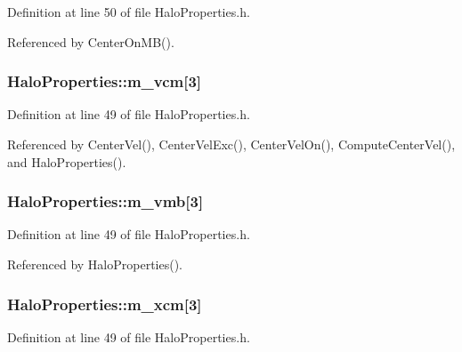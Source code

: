 Definition at line 50 of file HaloProperties.h.



Referenced by CenterOnMB().

\subsubsection[{m\_\-vcm}]{ {\bf HaloProperties::m\_\-vcm}\mbox{[}3\mbox{]}}\label{classHaloProperties_a367b37a34cf13626d6a6f008daadedf4}


Definition at line 49 of file HaloProperties.h.



Referenced by CenterVel(), CenterVelExc(), CenterVelOn(), ComputeCenterVel(), and HaloProperties().

\subsubsection[{m\_\-vmb}]{ {\bf HaloProperties::m\_\-vmb}\mbox{[}3\mbox{]}}\label{classHaloProperties_a17b99f065e4e45eda4a15d2cdf8adef4}


Definition at line 49 of file HaloProperties.h.



Referenced by HaloProperties().

\subsubsection[{m\_\-xcm}]{ {\bf HaloProperties::m\_\-xcm}\mbox{[}3\mbox{]}}\label{classHaloProperties_ad839c03623bf7980cc14a7fa5ea2fdc2}


Definition at line 49 of file HaloProperties.h.



